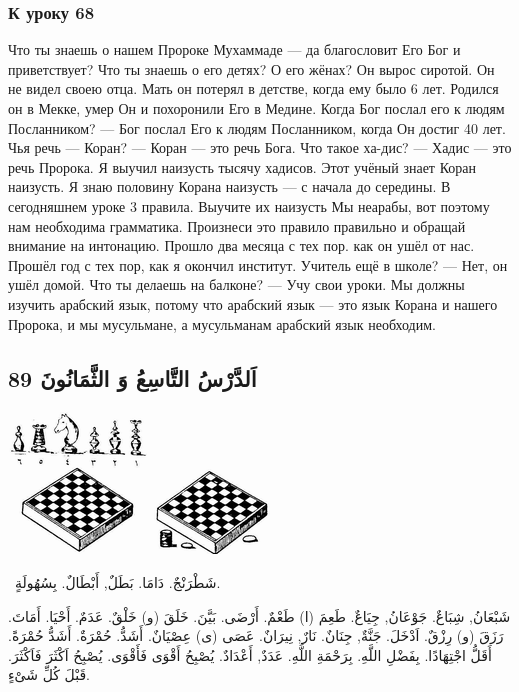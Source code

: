\documentclass[a5paper]{article}
\begin{document}
\subsubsection{К уроку 68}
Что ты знаешь о нашем Пророке Мухаммаде — да благословит Его Бог и приветствует? Что ты знаешь о его детях? О его жёнах? Он вырос сиротой. Он не видел своею отца. Мать он потерял в детстве, когда ему было 6 лет. Родился он в Мекке, умер Он и похоронили Его в Медине. Когда Бог послал его к людям Посланником? — Бог послал Его к людям Посланником, когда Он достиг 40 лет. Чья речь — Коран? — Коран — это речь Бога. Что такое ха-дис? — Хадис — это речь Пророка. Я выучил наизусть тысячу хадисов. Этот учёный знает Коран наизусть. Я знаю половину Корана наизусть — с начала до середины. В сегодняшнем уроке 3 правила. Выучите их наизусть Мы неарабы, вот поэтому нам необходима грамматика. Произнеси это правило правильно и обращай внимание на интонацию. Прошло два месяца с тех пор. как он ушёл от нас. Прошёл год с тех пор, как я окончил институт. Учитель ещё в шко­ле? — Нет, он ушёл домой. Что ты делаешь на балконе? — Учу свои уроки. Мы должны изучить арабский язык, потому что арабский язык — это язык Корана и нашего Пророка, и мы мусульмане, а мусульманам арабский язык необходим.

\subsection[اَلدَّرْسُ التَّاسِعُ وَ الثَّمَانُونَ 89]{اَلدَّرْسُ التَّاسِعُ وَ الثَّمَانُونَ 89}
 \includegraphics[width=1.448in,height=1.5in]{images/MuhammadBagauddinprettified-img251.png}   \includegraphics[width=1.2602in,height=0.8957in]{images/MuhammadBagauddinprettified-img252.png} 

\ شَطْرَنْجٌ. دَامَا. بَطَلٌ, أَبْطَالٌ. بِسُهُولَةٍ. 

شَبْعَانُ, شِبَاعٌ. جَوْعَانُ, جِيَاعٌ. طَعِمَ (ا) طَعْمٌ. أَرْضَى. بَيَّنَ. خَلَقَ (و) خَلْقٌ. عَدَمٌ. أَحْيَا. أَمَاتَ. رَزَقَ (و) رِزْقٌ. اَدْخَلَ. جَنَّةٌ, جِنَانٌ. نَارٌ, نِيرَانٌ. عَصَى (ى) عِصْيَانٌ. أَشَدُّ. حُمْرَةٌ. أَشَدُّ حُمْرَةً. أَقَلُّ اجْتِهَادًا. بِفَضْلِ اللَّهِ. بِرَحْمَةِ اللَّهِ. عَدَدٌ, أَعْدَادٌ. يُصْبِحُ أَقْوَى فَأَقْوَى. يُصْبِحُ اَكْثَرَ فَاَكْثَرَ. قَبْلَ كُلِّ شَىْءٍ.
\end{document}
